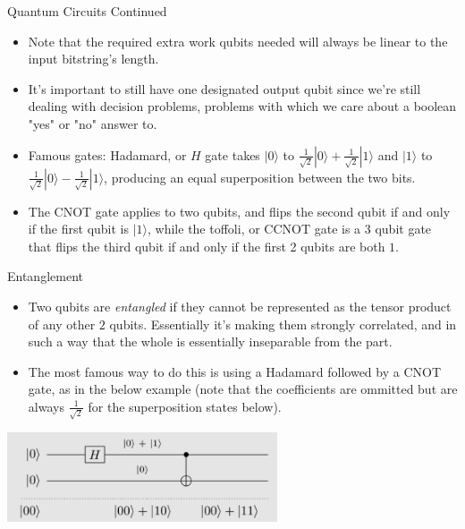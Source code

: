 \documentclass[aspectratio=169]{beamer}
\begin{document}
\begin{frame}{Quantum Circuits Continued}
  \begin{itemize}
    \item Note that the required extra work qubits needed will always be linear to the input bitstring's length. \pause
    \item It's important to still have one designated output qubit since we're still dealing with decision problems, problems with which we care about a boolean "yes" or "no" answer to. \pause
    \item Famous gates: Hadamard, or $H$ gate takes $|0\rangle$ to $\frac{1}{\sqrt{2}} |0\rangle + \frac{1}{\sqrt{2}} |1\rangle$ and $|1\rangle$ to $\frac{1}{\sqrt{2}} |0\rangle - \frac{1}{\sqrt{2}} |1\rangle$, producing an equal superposition between the two bits. \pause
    \item The CNOT gate applies to two qubits, and flips the second qubit if and only if the first qubit is $|1\rangle$, while the toffoli, or CCNOT gate is a 3 qubit gate that flips the third qubit if and only if the first 2 qubits are both $1$.
  \end{itemize}
\end{frame}

\begin{frame}{Entanglement}
  \begin{itemize}
    \item Two qubits are \emph{entangled} if they cannot be represented as the tensor product of any other $2$ qubits. Essentially it's making them strongly correlated, and in such a way that the whole is essentially inseparable from the part.
    \item The most famous way to do this is using a Hadamard followed by a CNOT gate, as in the below example (note that the coefficients are ommitted but are always $\frac{1}{\sqrt{2}}$ for the superposition states below).
  \end{itemize}
  \begin{center}
    \includegraphics[width=0.6\textwidth, height=0.6\textheight, keepaspectratio]{entanglement.PNG}
  \end{center}
\end{frame}
\end{document}

